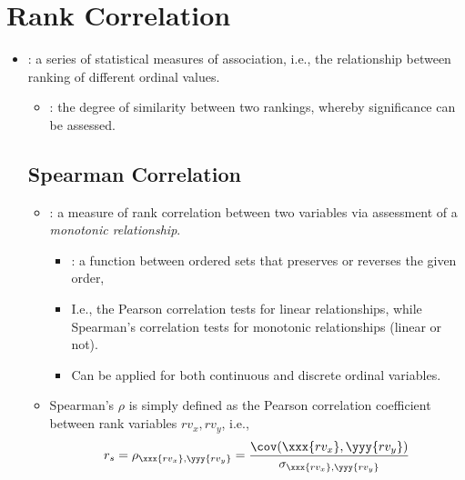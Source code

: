 \section{Rank Correlation}
\begin{itemize}
  \item {}: a series of statistical measures of \hyperref[Subsection: Data Types]{} association, i.e., the relationship between ranking of different ordinal values.
    \begin{itemize}
      \item {}: the degree of similarity between two rankings, whereby significance can be assessed.
    \end{itemize}
  
  \subsection{Spearman Correlation}
  \begin{itemize}
    \item {}: a \hyperref[Subsection: Parametric vs. Nonparametric]{} measure of rank correlation between two variables via assessment of a \emph{monotonic relationship}.
      \begin{itemize}
        \item {}: a function between ordered sets that preserves or reverses the given order, 
        \item I.e., the Pearson correlation tests for linear relationships, while Spearman's correlation tests for monotonic relationships (linear or not). 
        \item Can be applied for both continuous and discrete ordinal variables. 
      \end{itemize}
    \item Spearman's \(\rho \) is simply defined as the Pearson correlation coefficient between rank variables \(rv_x, rv_y\), i.e.,
    \[%
    r_s = \rho_{\xxx{rv_x},\yyy{rv_y}} = \frac{\cov(\xxx{rv_x},\yyy{rv_y})}{\sigma_{\xxx{rv_x},\yyy{rv_y}}}
    \]%
  \end{itemize}


\end{itemize}
